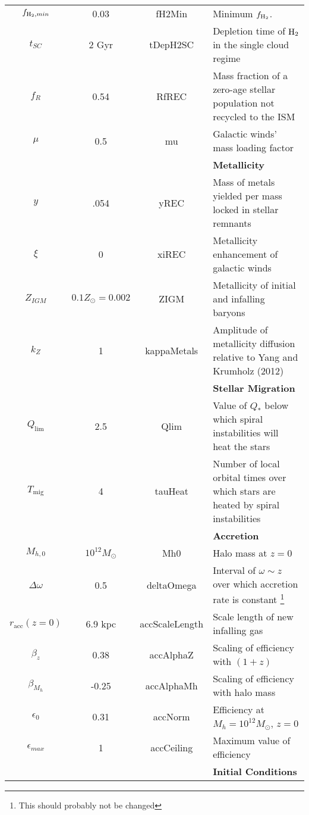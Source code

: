 \documentclass[11pt]{amsart}
\begin{document}
\begin{table}
{\begin{tabular}{cccl}
        $f_{{\rm H}_2,min}$ & 0.03 & fH2Min & Minimum $f_{{\rm H}_2}$. \\
        $t_{SC}$ & 2 Gyr & tDepH2SC & Depletion time of ${\rm H}_2$ in the single cloud regime \\
        $f_R$ & 0.54 &  RfREC  & Mass fraction of a zero-age stellar population not recycled to the ISM \\
        $\mu$ & 0.5 & mu & Galactic winds' mass loading factor \\ \hline
        & & & {\bf Metallicity} \\
        $y$ & .054 & yREC & Mass of metals yielded per mass locked in stellar remnants \\
        $\xi$ & 0 & xiREC & Metallicity enhancement of galactic winds \\
        $Z_{IGM}$ & $0.1 Z_\odot = 0.002$ & ZIGM & Metallicity of initial and infalling baryons \\
        $k_Z$ & 1 & kappaMetals & Amplitude of metallicity diffusion relative to Yang and Krumholz (2012)\\ \hline
        & & & {\bf Stellar Migration}  \\
        $Q_\mathrm{lim}$ & 2.5 & Qlim & Value of $Q_*$ below which spiral instabilities will heat the stars \\
        $T_\mathrm{mig}$ & 4 & tauHeat & Number of local orbital times over which stars are heated by spiral instabilities \\ \hline
        & & & {\bf Accretion}  \\
        $M_{h,0}$ & $10^{12} M_\odot$ & Mh0 & Halo mass at $z=0$ \\
        $\Delta \omega$ & 0.5 & deltaOmega & Interval of $\omega \sim z$ over which accretion rate is constant \footnote{This should probably not be changed} \\
        $r_\mathrm{acc}(z=0)$ & 6.9 kpc & accScaleLength & Scale length of new infalling gas \\
        $\beta_z$ & 0.38 & accAlphaZ & Scaling of efficiency with $(1+z)$\\
        $\beta_{M_h}$ & -0.25 & accAlphaMh & Scaling of efficiency with halo mass \\
        $\epsilon_0$ & 0.31 & accNorm & Efficiency at $M_h=10^{12} M_\odot$, $z=0$\\
        $\epsilon_{max}$ & 1 & accCeiling & Maximum value of efficiency\\ \hline
        & & & {\bf Initial Conditions} \\

\end{tabular}}
\end{table}
\end{document}
